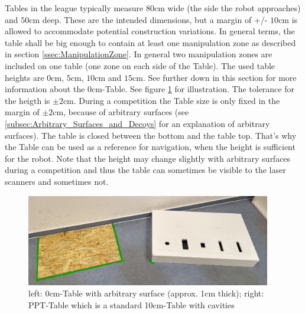 Tables in the league typically measure $80\si{\centi\meter}$ wide (the side the robot approaches) and $50\si{\centi\meter}$ deep. These are the intended dimensions, but a margin of +/- $10\si{\centi\meter}$ is allowed to accommodate potential construction variations. In general terms, the table shall be big enough to contain at least one manipulation zone as described in section \ref{ssec:ManipulationZone}. In general two manipulation zones are included on one table (one zone on each side of the Table). The used table heights are $0\si{\centi\meter}$, $5\si{\centi\meter}$, $10\si{\centi\meter}$ and $15\si{\centi\meter}$. See further down in this section for more information about the $0\si{\centi\meter}$-Table. See figure \ref{fig:ws} for illustration. 
The tolerance for the heigth is $\pm 2 \si{\centi\meter}$. During a competition the Table size is only fixed in the margin of $\pm 2 \si{\centi\meter}$, because of arbitrary surfaces (see \ref{subsec:Arbitrary_Surfaces_and_Decoys} for an explanation of arbitrary surfaces). 
The table is closed between the bottom and the table top. That's why the Table can be used as a reference for navigation, when the height is sufficient for the robot. Note that the height may change slightly with arbitrary surfaces during a competition and thus the table can sometimes be visible to the laser scanners and sometimes not. 
 
\begin{figure} [h!]
	\begin{center}
		\includegraphics[height = 4cm]{./images/arena/tables_small.jpg}	
	\end{center}
	\caption{left: 0\si{\centi\meter}-Table with arbitrary surface (approx. 1\si{\centi\meter} thick); right: PPT-Table which is a standard 10\si{\centi\meter}-Table with cavities}
	\label{fig:ws}
\end{figure}


